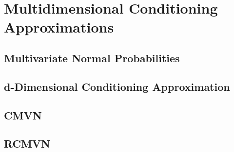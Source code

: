 \section{Multidimensional Conditioning Approximations}

\subsection{Multivariate Normal Probabilities} 

\subsection{d-Dimensional Conditioning Approximation}

\subsection{CMVN}
\subsection{RCMVN}